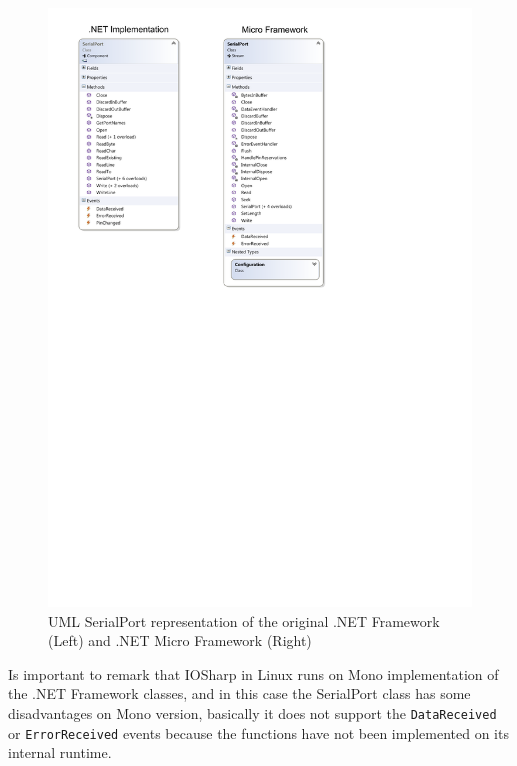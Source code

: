 \begin{figure}[H]\begin{center}
 \centering
  \captionsetup{justification=centering}
  \includegraphics[scale=1]{pictures/iosharp/serialport-uml}
  \caption{UML SerialPort representation of the original .NET Framework (Left) and .NET Micro Framework (Right)\label{fig:serialport-uml}}
\end{center}\end{figure}

Is important to remark that IOSharp in Linux runs on Mono implementation of the .NET Framework classes, and in this case the SerialPort class has some disadvantages on Mono version, basically it does not support the \verb!DataReceived! or \verb!ErrorReceived! events because the functions have not been implemented on its internal runtime.

